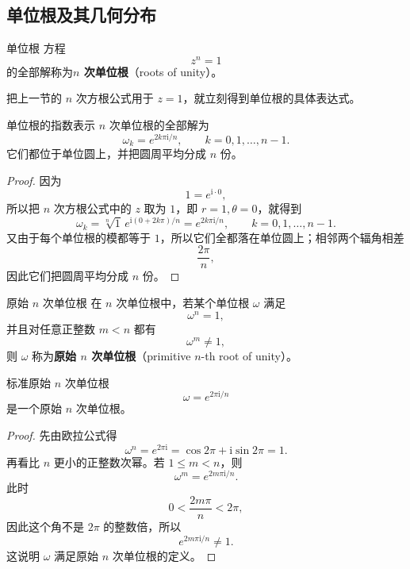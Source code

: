 \subsection{单位根及其几何分布}

\begin{dingliyi}{单位根}{}
方程
\begin{equation}
    z^n=1
\end{equation}
的全部解称为\textbf{$n$ 次单位根}（roots of unity）。
\end{dingliyi}

把上一节的 $n$ 次方根公式用于 $z=1$，就立刻得到单位根的具体表达式。
\begin{tuilun}{单位根的指数表示}{}
$n$ 次单位根的全部解为
\begin{equation}
    \omega_k=e^{2k\pi\mathrm{i}/n},\qquad k=0,1,\dots,n-1.
\end{equation}
它们都位于单位圆上，并把圆周平均分成 $n$ 份。
\end{tuilun}

\begin{proof}
因为
\[
1=e^{\mathrm{i}\cdot 0},
\]
所以把 $n$ 次方根公式中的 $z$ 取为 $1$，即 $r=1,\theta=0$，就得到
\[
\omega_k=\sqrt[n]{1}\,e^{\mathrm{i}(0+2k\pi)/n}=e^{2k\pi\mathrm{i}/n},\qquad k=0,1,\dots,n-1.
\]
又由于每个单位根的模都等于 $1$，所以它们全都落在单位圆上；相邻两个辐角相差
\[
\frac{2\pi}{n},
\]
因此它们把圆周平均分成 $n$ 份。
\end{proof}

\begin{dingliyi}{原始 \texorpdfstring{$n$}{n} 次单位根}{}
在 $n$ 次单位根中，若某个单位根 $\omega$ 满足
\[
\omega^n=1,
\]
并且对任意正整数 $m<n$ 都有
\[
\omega^m\neq 1,
\]
则 $\omega$ 称为\textbf{原始 $n$ 次单位根}（primitive $n$-th root of unity）。
\end{dingliyi}

\begin{tuilun}{标准原始 \texorpdfstring{$n$}{n} 次单位根}{}
\[
\omega=e^{2\pi\mathrm{i}/n}
\]
是一个原始 $n$ 次单位根。
\end{tuilun}

\begin{proof}
先由欧拉公式得
\[
\omega^n=e^{2\pi\mathrm{i}}=\cos 2\pi+\mathrm{i}\sin 2\pi=1.
\]
再看比 $n$ 更小的正整数次幂。若 $1\le m<n$，则
\[
\omega^m=e^{2m\pi\mathrm{i}/n}.
\]
此时
\[
0<\frac{2m\pi}{n}<2\pi,
\]
因此这个角不是 $2\pi$ 的整数倍，所以
\[
e^{2m\pi\mathrm{i}/n}\neq 1.
\]
这说明 $\omega$ 满足原始 $n$ 次单位根的定义。
\end{proof}

